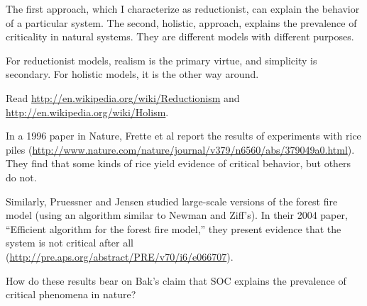 \documentclass[10pt]{book}
\begin{document}
The first approach, which I characterize as reductionist,
can explain the behavior of a particular system.  The
second, holistic, approach, explains the prevalence of
criticality in natural systems.  They are different models
with different purposes.

For reductionist models, realism is the primary virtue, and
simplicity is secondary.  For holistic models, it is the other
way around.

\begin{exercise}

Read \url{http://en.wikipedia.org/wiki/Reductionism}
and \url{http://en.wikipedia.org/wiki/Holism}.

\end{exercise}


\begin{exercise}

In a 1996 paper in Nature, Frette et al report the results of
experiments with rice piles
(\url{http://www.nature.com/nature/journal/v379/n6560/abs/379049a0.html}).
They find that some kinds of rice yield evidence of critical behavior,
but others do not.  

Similarly, Pruessner and Jensen studied large-scale versions of the
forest fire model (using an algorithm similar to Newman and Ziff's).
In their 2004 paper, ``Efficient algorithm for the forest fire model,''
they present evidence that the system is not critical after all
(\url{http://pre.aps.org/abstract/PRE/v70/i6/e066707}).

How do these results bear on Bak's claim that SOC explains
the prevalence of critical phenomena in nature?

\end{exercise}
\end{document}
